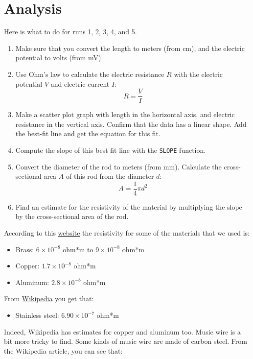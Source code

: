 \section{Analysis}
Here is what to do for runs 1, 2, 3, 4, and 5.
\begin{enumerate}
	\item Make sure that you convert the length to meters (from cm), and the electric potential to volts (from mV).
	\item Use Ohm's law to calculate the electric resistance $R$ with the electric potential $V$ and electric current $I$:
	\begin{equation}
		R = \frac{V}{I}	
	\end{equation}
	\item Make a scatter plot graph with length in the horizontal axis, and electric resistance in the vertical axis. Confirm that the data has a linear shape. Add the best-fit line and get the equation for this fit.
	\item Compute the slope of this best fit line with the \texttt{SLOPE} function.
	\item Convert the diameter of the rod to meters (from mm). Calculate the cross-sectional area $A$ of this rod from the diameter $d$:
	\begin{equation}
		A = \frac{1}{4} \pi d^2
	\end{equation}
	\item Find an estimate for the resistivity of the material by multiplying the slope by the cross-sectional area of the rod.
\end{enumerate}
According to this \href{http://www.radio-electronics.com/info/formulae/resistance/resistivity-table.php}{website} the resistivity for some of the materials that we used is:
\begin{itemize}
	\item Brass: $6 \times 10^{-8}$ ohm*m to $9 \times 10^{-8}$ ohm*m
	\item Copper: $1.7 \times 10^{-8}$ ohm*m
	\item Aluminum: $2.8 \times 10^{-8}$ ohm*m
\end{itemize}
From \href{https://en.wikipedia.org/wiki/Electrical_resistivity_and_conductivity}{Wikipedia} you get that:
\begin{itemize}
	\item Stainless steel: $6.90 \times 10^{-7}$ ohm*m
\end{itemize}
Indeed, Wikipedia has estimates for copper and aluminum too. Music wire is a bit more tricky to find. Some kinds of music wire are made of carbon steel. From the Wikipedia article, you can see that:
